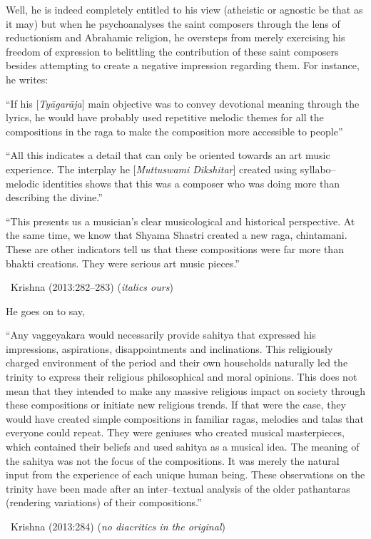 Well, he is indeed completely entitled to his view (atheistic or agnostic be that as it may) but when he psychoanalyses the saint composers through the lens of reductionism and Abrahamic religion, he oversteps from merely exercising his freedom of expression to belittling the contribution of these saint composers besides attempting to create a negative impression regarding them. For instance, he writes:

\begin{myquote}
“If his [\textit{Tyāgarāja}] main objective was to convey devotional meaning through the lyrics, he would have probably used repetitive melodic themes for all the compositions in the raga to make the composition more accessible to people”
\end{myquote}

\begin{myquote}
“All this indicates a detail that can only be oriented towards an art music experience. The interplay he [\textit{Muttuswami Dikshitar}] created using syllabo–melodic identities shows that this was a composer who was doing more than describing the divine.”
\end{myquote}

\begin{myquote}
“This presents us a musician’s clear musicological and historical perspective. At the same time, we know that Shyama Shastri created a new raga, chintamani. These are other indicators tell us that these compositions were far more than bhakti creations. They were serious art music pieces.” 

~\hfill Krishna (2013:282–283) (\textit{italics ours})
\end{myquote}

He goes on to say,

\begin{myquote}
“Any vaggeyakara would necessarily provide sahitya that expressed his impressions, aspirations, disappointments and inclinations. This religiously charged environment of the period and their own households naturally led the trinity to express their religious philosophical and moral opinions. This does not mean that they intended to make any massive religious impact on society through these compositions or initiate new religious trends. If that were the case, they would have created simple compositions in familiar ragas, melodies and talas that everyone could repeat. They were geniuses who created musical masterpieces, which contained their beliefs and used sahitya as a musical idea. The meaning of the sahitya was not the focus of the compositions. It was merely the natural input from the experience of each unique human being. These observations on the trinity have been made after an inter–textual analysis of the older pathantaras (rendering variations) of their compositions.” 

~\hfill Krishna (2013:284) (\textit{no diacritics in the original})
\end{myquote}

